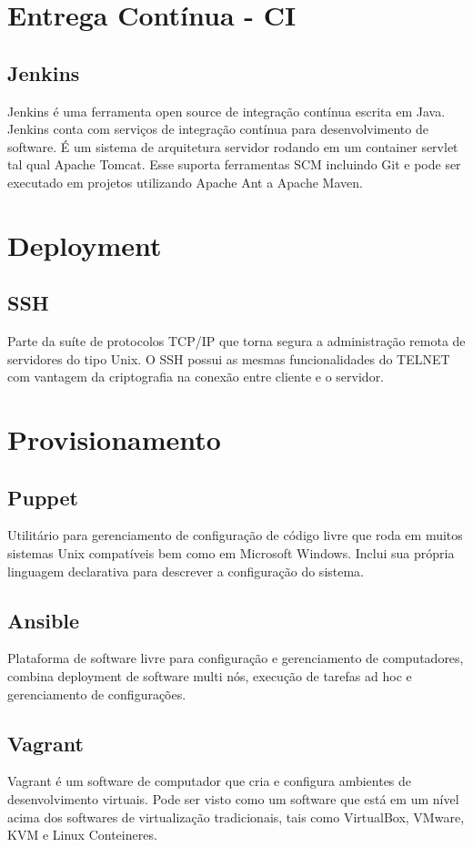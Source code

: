     \section{Entrega Contínua - CI}
	\subsection{Jenkins} Jenkins é uma ferramenta open source de 
	integração contínua escrita em Java. Jenkins conta com serviços 
	de integração contínua para desenvolvimento de software. 
	É um sistema de arquitetura servidor rodando em um container 
	servlet tal qual Apache Tomcat. Esse suporta ferramentas SCM 
	incluindo Git e pode ser executado em projetos utilizando 
	Apache Ant a Apache Maven.

    \section{Deployment}
	\subsection{SSH}Parte da suíte de protocolos TCP/IP que torna 
	segura a administração remota de servidores do tipo Unix. O SSH 
	possui as mesmas funcionalidades do TELNET com vantagem da 
	criptografia na conexão entre cliente e o servidor.

    \section{Provisionamento}

	\subsection{Puppet} Utilitário para gerenciamento de configuração de 
	código livre que roda em muitos sistemas Unix compatíveis bem como 
	em Microsoft Windows. Inclui sua própria linguagem declarativa para 
	descrever a configuração do sistema.

	\subsection{Ansible} Plataforma de software livre para configuração e 
	gerenciamento de computadores, combina deployment de software multi 
	nós, execução de tarefas ad hoc e gerenciamento de configurações.
	
	\subsection{Vagrant} Vagrant é um software de computador que cria e 
	configura ambientes de desenvolvimento virtuais. Pode ser visto como 
	um software que está em um nível acima dos softwares de virtualização 
	tradicionais, tais como VirtualBox, VMware, KVM e Linux Conteineres.


